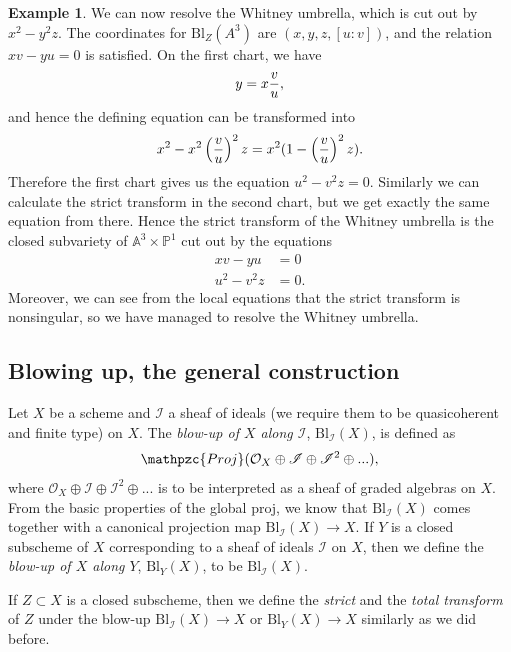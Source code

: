 \documentclass[12pt,a4paper,leqno]{article}
\newcommand{\Aff}{\mathbb{A}}
\newcommand{\Proj}{\mathbb{P}}
\newcommand{\OO}{\mathcal{O}}
\newcommand{\bl}{\mathrm{Bl}}
\newcommand{\rproj}{\mathpzc{Proj}}
\theoremstyle{plain}
\theoremstyle{definition}
\newtheorem{ex}[theo]{Example}
\theoremstyle{remark}
\begin{document}
\begin{ex}
We can now resolve the Whitney umbrella, which is cut out by $x^2 - y^2 z$. The coordinates for $\bl_Z (A^3)$ are $(x,y,z,[u:v])$, and the relation $xv-yu = 0$ is satisfied. On the first chart, we have 
\begin{equation*}
y = x {v \over u},
\end{equation*} 
and hence the defining equation can be transformed into
\begin{equation*}
x^2 -  x^2\left( {v \over u} \right)^2 z = x^2 ( 1 - \left( {v \over u} \right)^2 z ).
\end{equation*}
Therefore the first chart gives us the equation $u^2 - v^2 z = 0$. Similarly we can calculate the strict transform in the second chart, but we get exactly the same equation from there. Hence the strict transform of the Whitney umbrella is the closed subvariety of $\Aff^3 \times \Proj^1$ cut out by the equations
\begin{align*}
xv-yu &= 0\\
u^2 - v^2 z &= 0.
\end{align*}
Moreover, we can see from the local equations that the strict transform is nonsingular, so we have managed to resolve the Whitney umbrella.
\end{ex}

\subsection{Blowing up, the general construction}

Let $X$ be a scheme and $\mathscr{I}$ a sheaf of ideals (we require them to be quasicoherent and finite type) on $X$. The \emph{blow-up of $X$ along $\mathscr{I}$}, $\bl_{\mathscr{I}} (X)$, is defined as 
\begin{equation*}
\rproj ( \OO_X \oplus \mathscr{I} \oplus \mathscr{I}^2 \oplus ...),
\end{equation*}
where $\OO_X \oplus \mathscr{I} \oplus \mathscr{I}^2 \oplus ...$ is to be interpreted as a sheaf of graded algebras on $X$. From the basic properties of the global proj, we know that $\bl_\mathscr{I} (X)$ comes together with a canonical projection map $\bl_\mathscr{I}(X) \to X$. If $Y$ is a closed subscheme of $X$ corresponding to a sheaf of ideals $\mathscr{I}$ on $X$, then we define the \emph{blow-up of $X$ along $Y$}, $\bl_Y (X)$, to be $\bl_\mathscr{I} (X)$.

If $Z \subset X$ is a closed subscheme, then we define the \emph{strict} and the \emph{total transform} of $Z$ under the blow-up $\bl_\mathscr{I}(X) \to X$ or $\bl_Y(X) \to X$ similarly as we did before. 
\end{document}
